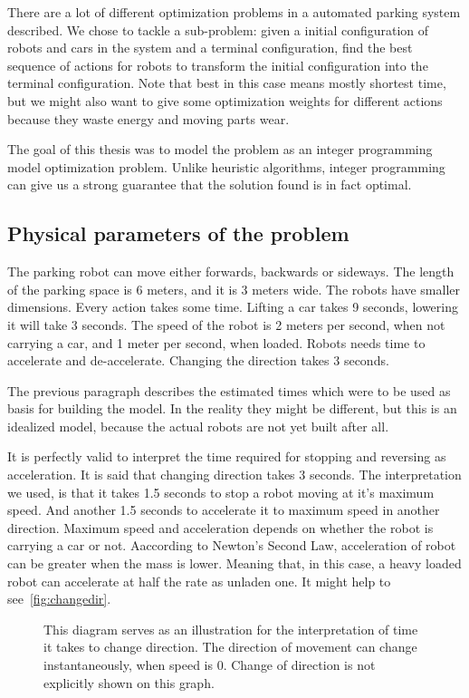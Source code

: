 There are a lot of different optimization problems in a automated parking system
described. We chose to tackle a sub-problem: given a initial configuration of
robots and cars in the system and a terminal configuration, find the best
sequence of actions for robots to transform the initial configuration into the
terminal configuration. Note that best in this case means mostly shortest time,
but we might also want to give some optimization weights for different actions because 
they waste energy and moving parts wear.

The goal of this thesis was to model the problem as an integer programming
model optimization problem. Unlike heuristic algorithms, integer programming
can give us a strong guarantee that the solution found is in fact optimal.

\subsection{Physical parameters of the problem}
The parking robot can move either forwards, backwards or sideways. The length of
the parking space is 6 meters, and it is 3 meters wide. The robots have smaller
dimensions. Every action takes some time. Lifting a car takes 9 seconds,
lowering it will take 3 seconds. The speed of the robot is 2 meters per second,
when not carrying a car, and 1 meter per second, when loaded. Robots needs time
to accelerate and de-accelerate. Changing the direction takes 3 seconds.

The previous paragraph describes the estimated times which were to be used as
basis for building the model. In the reality they might be different, but this
is an idealized model, because the actual robots are not yet built after all.

It is perfectly valid to interpret the time required for stopping and reversing as acceleration. 
It is said that changing direction takes 3 seconds. The interpretation we used, is
that it takes 1.5 seconds to stop a robot moving at it's maximum speed. And
another 1.5 seconds to accelerate it to maximum speed in another direction.
Maximum speed and acceleration depends on whether the robot is carrying a car or not.
Aaccording to Newton's Second Law, acceleration of robot can be greater when the mass is lower. Meaning that, in this case, a heavy loaded robot can
accelerate at half the rate as unladen one. It might help to
see~\autoref{fig:changedir}.

\begin{figure}[h]
    \begin{center}
        
        \caption{This diagram serves as an illustration for the interpretation of
            time it takes to change direction. The direction of movement can change
            instantaneously, when speed is 0. Change of direction is not explicitly shown on
            this graph.}
        \label{fig:changedir}
    \end{center}
\end{figure}

